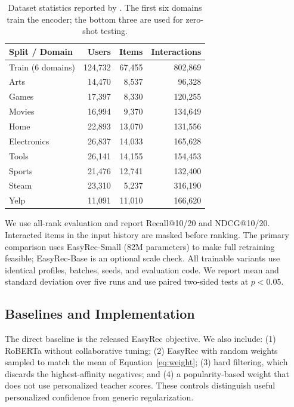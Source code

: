 \documentclass[11pt]{article}
\begin{document}
\begin{table}[t]
\centering
\small
\begin{tabular}{lrrr}
\toprule
Split / Domain & Users & Items & Interactions \\
\midrule
Train (6 domains) & 124,732 & 67,455 & 802,869 \\
\quad Arts & 14,470 & 8,537 & 96,328 \\
\quad Games & 17,397 & 8,330 & 120,255 \\
\quad Movies & 16,994 & 9,370 & 134,649 \\
\quad Home & 22,893 & 13,070 & 131,556 \\
\quad Electronics & 26,837 & 14,033 & 165,628 \\
\quad Tools & 26,141 & 14,155 & 154,453 \\
\midrule
Sports & 21,476 & 12,741 & 132,400 \\
Steam & 23,310 & 5,237 & 316,190 \\
Yelp & 11,091 & 11,010 & 166,620 \\
\bottomrule
\end{tabular}
\caption{Dataset statistics reported by \citet{ren-huang-2025-easyrec}. The first six domains train the encoder; the bottom three are used for zero-shot testing.}
\label{tab:data}
\end{table}

We use all-rank evaluation and report Recall@10/20 and NDCG@10/20.
Interacted items in the input history are masked before ranking.
The primary comparison uses EasyRec-Small (82M parameters) to make full retraining feasible; EasyRec-Base is an optional scale check.
All trainable variants use identical profiles, batches, seeds, and evaluation code.
We report mean and standard deviation over five runs and use paired two-sided tests at $p<0.05$.

\subsection{Baselines and Implementation}

The direct baseline is the released EasyRec objective.
We also include: (1) RoBERTa without collaborative tuning; (2) EasyRec with random weights sampled to match the mean of Equation~\ref{eq:weight}; (3) hard filtering, which discards the highest-affinity negatives; and (4) a popularity-based weight that does not use personalized teacher scores.
These controls distinguish useful personalized confidence from generic regularization.
\end{document}
